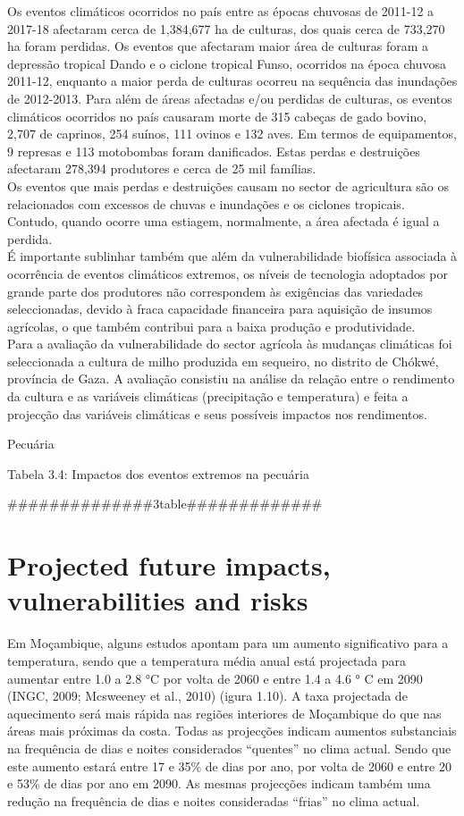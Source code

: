 \documentclass[
]{book}
\begin{document}
Os eventos climáticos ocorridos no país entre as épocas chuvosas de 2011-12 a 2017-18 afectaram cerca de 1,384,677 ha de culturas, dos quais cerca de 733,270 ha foram perdidas. Os eventos que afectaram maior área de culturas foram a depressão tropical Dando e o ciclone tropical Funso, ocorridos na época chuvosa 2011-12, enquanto a maior perda de culturas ocorreu na sequência das inundações de 2012-2013.
Para além de áreas afectadas e/ou perdidas de culturas, os eventos climáticos ocorridos no país causaram morte de 315 cabeças de gado bovino, 2,707 de caprinos, 254 suínos, 111 ovinos e 132 aves. Em termos de equipamentos, 9 represas e 113 motobombas foram danificados. Estas perdas e destruições afectaram 278,394 produtores e cerca de 25 mil famílias.\\
Os eventos que mais perdas e destruições causam no sector de agricultura são os relacionados com excessos de chuvas e inundações e os ciclones tropicais. Contudo, quando ocorre uma estiagem, normalmente, a área afectada é igual a perdida.\\
É importante sublinhar também que além da vulnerabilidade biofísica associada à ocorrência de eventos climáticos extremos, os níveis de tecnologia adoptados por grande parte dos produtores não correspondem às exigências das variedades seleccionadas, devido à fraca capacidade financeira para aquisição de insumos agrícolas, o que também contribui para a baixa produção e produtividade.\\
Para a avaliação da vulnerabilidade do sector agrícola às mudanças climáticas foi seleccionada a cultura de milho produzida em sequeiro, no distrito de Chókwé, província de Gaza. A avaliação consistiu na análise da relação entre o rendimento da cultura e as variáveis climáticas (precipitação e temperatura) e feita a projecção das variáveis climáticas e seus possíveis impactos nos rendimentos.

Pecuária

Tabela 3.4: Impactos dos eventos extremos na pecuária

\#\#\#\#\#\#\#\#\#\#\#\#\#\#3table\#\#\#\#\#\#\#\#\#\#\#\#\#

\hypertarget{projected-future-impacts-vulnerabilities-and-risks}{%
\section{Projected future impacts, vulnerabilities and risks}\label{projected-future-impacts-vulnerabilities-and-risks}}

Em Moçambique, alguns estudos apontam para um aumento significativo para a temperatura, sendo que a temperatura média anual está projectada para aumentar entre 1.0 a 2.8 °C por volta de 2060 e entre 1.4 a 4.6 ° C em 2090 (INGC, 2009; Mcsweeney et al., 2010) (igura 1.10). A taxa projectada de aquecimento será mais rápida nas regiões interiores de Moçambique do que nas áreas mais próximas da costa. Todas as projecções indicam aumentos substanciais na frequência de dias e noites considerados ``quentes'' no clima actual. Sendo que este aumento estará entre 17 e 35\% de dias por ano, por volta de 2060 e entre 20 e 53\% de dias por ano em 2090. As mesmas projecções indicam também uma redução na frequência de dias e noites consideradas ``frias'' no clima actual.
\end{document}
